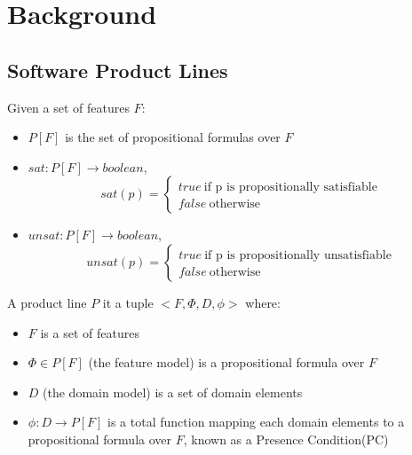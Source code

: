 \documentclass[10pt,conference]{llncs}
\begin{document}

\section{Background}

\subsection{Software Product Lines}

Given a set of features $F$:
\begin{itemize}
	\item $P[F]$ is the set of propositional formulas over $F$
	\item $sat:P[F] \to boolean$, \[ sat(p) = \begin{cases}
			true\ \text{if p is propositionally satisfiable} \\
			false\ \text{otherwise}
		\end{cases} \]
	\item $unsat:P[F] \to boolean$, \[ unsat(p) = \begin{cases}
			true\ \text{if p is propositionally unsatisfiable} \\
			false\ \text{otherwise}
		\end{cases} \]

\end{itemize}

A product line $P$ it a tuple $<F,\Phi,D,\phi>$ where:
\begin{itemize}
	\item $F$ is a set of features
	\item $\Phi \in P[F]$ (the feature model) is a propositional formula over $F$
	\item $D$ (the domain model) is a set of domain elements
	\item $\phi : D \to P[F]$ is a total function mapping each domain elements to a propositional formula over $F$, known as a Presence Condition(PC)
\end{itemize}
\end{document}
